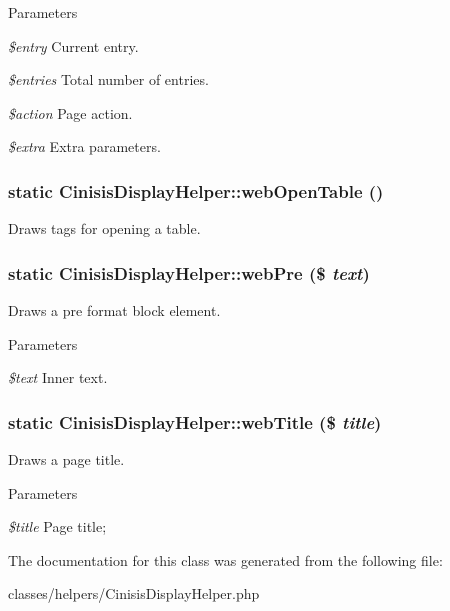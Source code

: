 \begin{DoxyParams}{Parameters}
\item[{\em \$entry}]Current entry.\item[{\em \$entries}]Total number of entries.\item[{\em \$action}]Page action.\item[{\em \$extra}]Extra parameters. \end{DoxyParams}
\hypertarget{classCinisisDisplayHelper_a4028def92d8511e525251ec7ab06246d}{
\subsubsection[{webOpenTable}]{\setlength{\rightskip}{0pt plus 5cm}static CinisisDisplayHelper::webOpenTable ()}}
\label{classCinisisDisplayHelper_a4028def92d8511e525251ec7ab06246d}
Draws tags for opening a table. \hypertarget{classCinisisDisplayHelper_a528283a8b16090918f1878dca5ee24fb}{
\subsubsection[{webPre}]{\setlength{\rightskip}{0pt plus 5cm}static CinisisDisplayHelper::webPre (\$ {\em text})}}
\label{classCinisisDisplayHelper_a528283a8b16090918f1878dca5ee24fb}
Draws a pre format block element.


\begin{DoxyParams}{Parameters}
\item[{\em \$text}]Inner text. \end{DoxyParams}
\hypertarget{classCinisisDisplayHelper_af3849efbba5e6980ddfdb4ceddb6ad17}{
\subsubsection[{webTitle}]{\setlength{\rightskip}{0pt plus 5cm}static CinisisDisplayHelper::webTitle (\$ {\em title})}}
\label{classCinisisDisplayHelper_af3849efbba5e6980ddfdb4ceddb6ad17}
Draws a page title.


\begin{DoxyParams}{Parameters}
\item[{\em \$title}]Page title; \end{DoxyParams}


The documentation for this class was generated from the following file:\begin{DoxyCompactItemize}
\item 
classes/helpers/CinisisDisplayHelper.php\end{DoxyCompactItemize}
